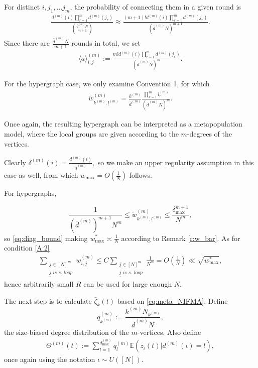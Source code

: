\documentclass{article}
\newcommand{\E}{\mathbb{E}}
\newcommand{\1}[1]{{\mathds{1}}_{\left\{#1\right\}}}
\newcommand{\remm}[1]{{#1}}
\begin{document}
	For distinct $i, j_1, \dots j_m$, the probability of connecting them in a given round is
	\begin{align*}
		\frac{d^{(m)}(i) \prod_{r=1}^m d^{(m)}(j_r)}{{\bar{d}^{(m)}N \choose m+1}} \approx \frac{(m+1)! d^{(m)}(i) \prod_{r=1}^m d^{(m)}(j_r)}{\left(\bar{d}^{(m)}N\right)^{m+1}}.
	\end{align*} 
	Since there are $\frac{\bar{d}^{(m)}N}{m+1}$ rounds in total, we set
	\begin{align*}
		\langle a \rangle_{i,\underline{j}}^{(m)}:=\frac{m! d^{(m)}(i) \prod_{r=1}^m d^{(m)}(j_r)}{\left(\bar{d}^{(m)}N\right)^{m}}.
	\end{align*}
	
	For the hypergraph case, we only examine Convention 1, for which
	\begin{align*}
		\tilde{w}_{k^{(m)}, \underline{l}^{(m)} }^{(m)}=\frac{k^{(m)}}{\bar{d}^{(m)}}\frac{  \prod_{r=1}^m l_r^{(m)} }{\left(\bar{d}^{(m)}N\right)^{m}}.
	\end{align*}
	
	Once again, the resulting hypergraph can be interpreted as a metapopulation model, where the local groups are given according to the $m$-degrees of the vertices.
	
	Clearly $\delta^{(m)}(i)= \frac{d^{(m)}(i)}{\bar{d}^{(m)}},$ so we make an upper regularity assumption in this case as well, from which $w_{\max}=O \left( \frac{1}{N} \right)$ follows.
	
	For hypergraphs,
	
	$$\remm{ \frac{1}{\left(\bar{d}^{(m)} \right)^{m+1}N^m}} \leq \tilde{w}_{k^{(m)}, \underline{l}^{(m)} }^{(m)} \leq \frac{\delta_{\max}^{m+1}}{N^m},$$ 
	so \eqref{eq:diag_bound}
	\remm{making $w_{\max}^{*} \asymp \frac{1}{N}$ according to Remark \ref{r:w_bar}. As for condition \eqref{A:2}}
	\begin{align}
		\label{eq:diag_bound2}
		\sum_{\substack{\underline{j} \in [N]^m \\ \underline{j} \textit{ is s.\ loop}}}w_{i, \underline{j}}^{(m)} \leq C \sum_{\substack{\underline{j} \in [N]^m \\ \underline{j} \textit{ is s.\ loop}}} \frac{1}{N^m} =O \left( \frac{1}{N}\right) \ll \sqrt{ \remm{ w_{\max}^{*}}},
	\end{align}
	hence arbitrarily small $R$ can be used for large enough $N$.
	
	The next step is to calculate $\bar{\zeta}_k(t)$ based on \eqref{eq:meta_NIFMA}. Define
	$$q_{k^{(m)}}^{(m)}:= \frac{k^{(m)}N_{k^{(m)}}}{ \bar{d}^{(m)} N},$$ 
	the size-biased degree distribution of the $m$-vertices. Also define
	\begin{align}
		\label{def:Theta2}
		\Theta^{(m)}(t):= \sum_{l=1}^{d_{\max}^{(m)}}q_{l}^{(m)}\E \left(\left.z_{\iota}(t) \right| d^{(m)}(\iota)=l \right),
	\end{align}
	once again using the notation $\iota \sim U \left([N] \right)$.
	
\end{document}
